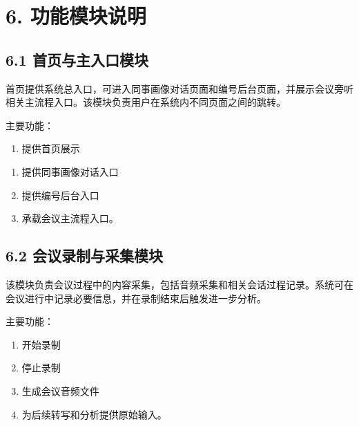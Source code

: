 \documentclass[12pt,a4paper]{article}
\begin{document}
\section*{6. 功能模块说明}
\vspace{0.45em}
\subsection*{6.1 首页与主入口模块}
\vspace{0.45em}
首页提供系统总入口，可进入同事画像对话页面和编号后台页面，并展示会议旁听相关主流程入口。该模块负责用户在系统内不同页面之间的跳转。\par
\vspace{0.45em}
主要功能：\par
\vspace{0.45em}
\begin{enumerate}
\item 提供首页展示
\end{enumerate}
\newpage
{}
\fancyhead[R]{}
\begin{enumerate}
\item 提供同事画像对话入口
\item 提供编号后台入口
\item 承载会议主流程入口。
\end{enumerate}
\vspace{0.45em}
\subsection*{6.2 会议录制与采集模块}
\vspace{0.45em}
该模块负责会议过程中的内容采集，包括音频采集和相关会话过程记录。系统可在会议进行中记录必要信息，并在录制结束后触发进一步分析。\par
\vspace{0.45em}
主要功能：\par
\vspace{0.45em}
\begin{enumerate}
\item 开始录制
\item 停止录制
\item 生成会议音频文件
\item 为后续转写和分析提供原始输入。
\end{enumerate}
\vspace{0.45em}
\end{document}
